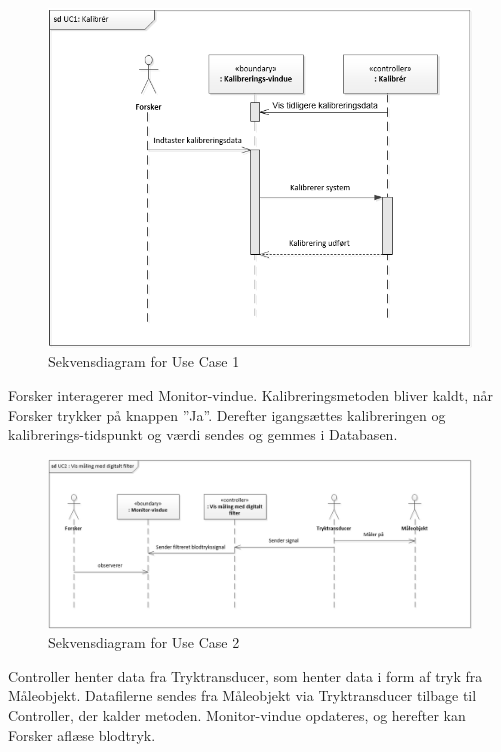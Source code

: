 \begin{figure}[H]
	\centering
	\includegraphics[width=1\textwidth]{Figurer/UC1_SD}
	\caption{Sekvensdiagram for Use Case 1}
\end{figure}

Forsker interagerer med Monitor-vindue. Kalibreringsmetoden bliver kaldt, når Forsker trykker på knappen ”Ja”. Derefter igangsættes kalibreringen og kalibrerings-tidspunkt og værdi sendes og gemmes i Databasen. 

\begin{figure}[H]
	\centering
	\includegraphics[width=1\textwidth]{Figurer/UC2_SD}
	\caption{Sekvensdiagram for Use Case 2}
\end{figure}

Controller henter data fra Tryktransducer, som henter data i form af tryk fra Måleobjekt. Datafilerne sendes fra Måleobjekt via Tryktransducer tilbage til Controller, der kalder metoden. Monitor-vindue opdateres, og herefter kan Forsker aflæse blodtryk. 

